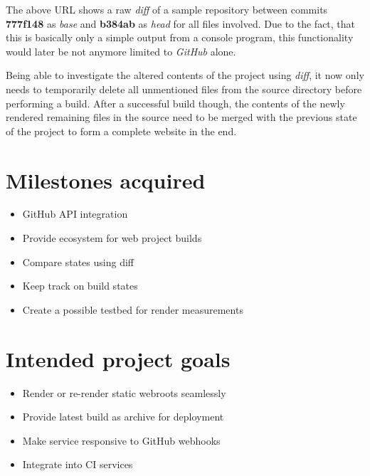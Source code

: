 \documentclass[a4paper,english,11pt]{report}
\begin{document}
The above URL shows a raw \emph{diff} of a sample repository between commits \textbf{777f148} as \emph{base} and \textbf{b384ab} as \emph{head} for all files involved. Due to the fact, that this is basically only a simple output from a console program, this functionality would later be not anymore limited to \emph{GitHub} alone.

Being able to investigate the altered contents of the project using \emph{diff}, it now only needs to temporarily delete all unmentioned files from the source directory before performing a build. After a successful build though, the contents of the newly rendered remaining files in the source need to be merged with the previous state of the project to form a complete website in the end.

\chapter{Milestones acquired}

\begin{itemize}
\item GitHub API integration
\item Provide ecosystem for web project builds
\item Compare states using diff
\item Keep track on build states
\item Create a possible testbed for render measurements
\end{itemize}



\chapter{Intended project goals}

\begin{itemize}
\item Render or re-render static webroots seamlessly
\item Provide latest build as archive for deployment
\item Make service responsive to GitHub webhooks
\item Integrate into CI services
\end{itemize}


\end{document}
